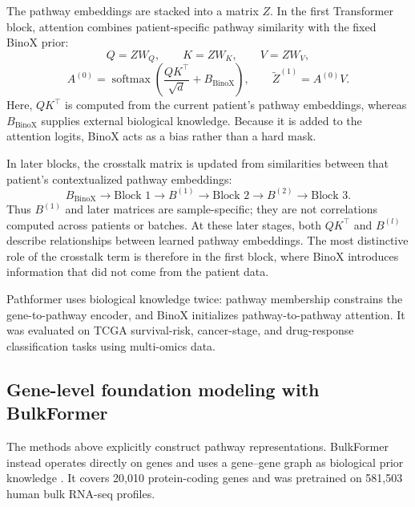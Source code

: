 \documentclass[11pt]{article}
\begin{document}
The pathway embeddings are stacked into a matrix $Z$. In the first Transformer
block, attention combines patient-specific pathway similarity with the fixed
BinoX prior:
\begin{equation}
    Q=ZW_Q,\qquad K=ZW_K,\qquad V=ZW_V,
\end{equation}
\begin{equation}
    A^{(0)}=\operatorname{softmax}\!\left(
        \frac{QK^{\top}}{\sqrt{d}}+B_{\mathrm{BinoX}}
    \right),
    \qquad
    \widetilde{Z}^{(1)}=A^{(0)}V.
\end{equation}
Here, $QK^{\top}$ is computed from the current patient's pathway embeddings,
whereas $B_{\mathrm{BinoX}}$ supplies external biological knowledge.
Because it is added to the attention logits, BinoX acts as a bias rather than a
hard mask.

In later blocks, the crosstalk matrix is updated from similarities between that
patient's contextualized pathway embeddings:
\begin{equation}
    B_{\mathrm{BinoX}}
    \longrightarrow \text{Block 1}
    \longrightarrow B^{(1)}
    \longrightarrow \text{Block 2}
    \longrightarrow B^{(2)}
    \longrightarrow \text{Block 3}.
\end{equation}
Thus $B^{(1)}$ and later matrices are sample-specific; they are not correlations
computed across patients or batches. At these later stages, both $QK^{\top}$
and $B^{(l)}$ describe relationships between learned pathway embeddings. The
most distinctive role of the crosstalk term is therefore in the first block,
where BinoX introduces information that did not come from the patient data.

Pathformer uses biological knowledge twice: pathway membership constrains the
gene-to-pathway encoder, and BinoX initializes pathway-to-pathway attention.
It was evaluated on TCGA survival-risk, cancer-stage, and drug-response
classification tasks using multi-omics data.

\subsection{Gene-level foundation modeling with BulkFormer}

The methods above explicitly construct pathway representations. BulkFormer
instead operates directly on genes and uses a gene--gene graph as biological
prior knowledge \cite{kang2026bulkformer}. It covers 20,010 protein-coding
genes and was pretrained on 581,503 human bulk RNA-seq profiles.
\end{document}
